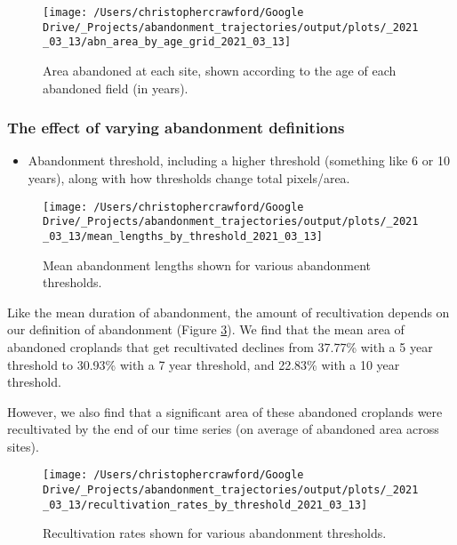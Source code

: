 \documentclass[
]{article}
\providecommand{\tightlist}{%
  \setlength{\itemsep}{0pt}\setlength{\parskip}{0pt}}
\begin{document}
\begin{figure}
\texttt{[image: /Users/christophercrawford/Google Drive/\_Projects/abandonment\_trajectories/output/plots/\_2021\_03\_13/abn\_area\_by\_age\_grid\_2021\_03\_13]} \caption{Area abandoned at each site, shown according to the age of each abandoned field (in years).}\label{fig:area-abn-by-age-class}
\end{figure}

\hypertarget{abn-thresholds}{%
\subsubsection{The effect of varying abandonment definitions}\label{abn-thresholds}}

\begin{itemize}
\tightlist
\item
  Abandonment threshold, including a higher threshold (something like 6 or 10 years), along with how thresholds change total pixels/area.
\end{itemize}



\begin{figure}
\texttt{[image: /Users/christophercrawford/Google Drive/\_Projects/abandonment\_trajectories/output/plots/\_2021\_03\_13/mean\_lengths\_by\_threshold\_2021\_03\_13]} \caption{Mean abandonment lengths shown for various abandonment thresholds.}\label{fig:abn-thresholds-mean-duration}
\end{figure}

Like the mean duration of abandonment, the amount of recultivation depends on our definition of abandonment (Figure \ref{fig:recult-by-threshold}). We find that the mean area of abandoned croplands that get recultivated declines from 37.77\% with a 5 year threshold to 30.93\% with a 7 year threshold, and 22.83\% with a 10 year threshold.

However, we also find that a significant area of these abandoned croplands were recultivated by the end of our time series (on average of abandoned area across sites).



\begin{figure}
\texttt{[image: /Users/christophercrawford/Google Drive/\_Projects/abandonment\_trajectories/output/plots/\_2021\_03\_13/recultivation\_rates\_by\_threshold\_2021\_03\_13]} \caption{Recultivation rates shown for various abandonment thresholds.}\label{fig:recult-by-threshold}
\end{figure}
\end{document}
